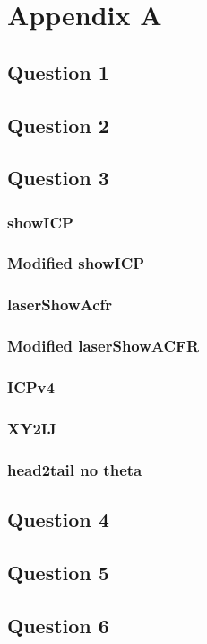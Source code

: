 \newpage
\renewcommand{\thesubsection}{\thesection.\arabic{subsection}}
\section{Appendix A}
	\subsection{Question 1}
	\pagebreak
	\subsection{Question 2}
	\pagebreak
	\subsection{Question 3}
		\subsubsection{showICP}
		
		\pagebreak
		\subsubsection{Modified showICP}
			
		\pagebreak
		\subsubsection{laserShowAcfr}
			
		\pagebreak
		\subsubsection{Modified laserShowACFR}
			
		\pagebreak
		\subsubsection{ICPv4}
			
		\pagebreak
		\subsubsection{XY2IJ}
			
		\pagebreak
		\subsubsection{head2tail no theta}
			
		\pagebreak
	\subsection{Question 4}
	\pagebreak
	\subsection{Question 5}
	\pagebreak
	\subsection{Question 6}
	\pagebreak
		